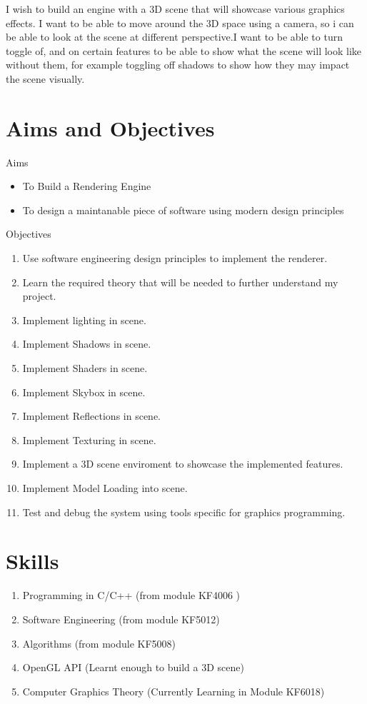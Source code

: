 I wish to build an engine with a 3D scene that will showcase various graphics effects. I want to be able to move around the 3D space using a camera, so i can be able to look at the scene at different perspective.I want to be able to turn toggle of, and on certain features to be able to show what the scene will look like without them, for example toggling off shadows to show how they may impact the scene visually.


\section{Aims and Objectives}
Aims
\begin{itemize}
  \item To Build a Rendering Engine
  \item To design a maintanable piece of software using modern design principles
\end{itemize}

Objectives
\begin{enumerate}
  \item Use software engineering design principles to implement the renderer.
  \item Learn the required theory that will be needed to further understand my project.
  \item Implement lighting in scene.
  \item Implement Shadows in scene.
  \item Implement Shaders in scene.
  \item Implement Skybox in scene.
  \item Implement Reflections in scene.
  \item Implement Texturing in scene.
  \item Implement a 3D scene enviroment to showcase the implemented features.
  \item Implement Model Loading into scene.
  \item Test and debug the system using tools specific for graphics programming.  
\end{enumerate}
\section{Skills}
\begin{enumerate}
	\item Programming in C/C++ (from module KF4006 )
	\item Software Engineering (from module KF5012)
	\item Algorithms (from module KF5008) 
	\item OpenGL API (Learnt enough to build a 3D scene) 
	\item Computer Graphics Theory (Currently Learning in Module KF6018)
\end{enumerate}


